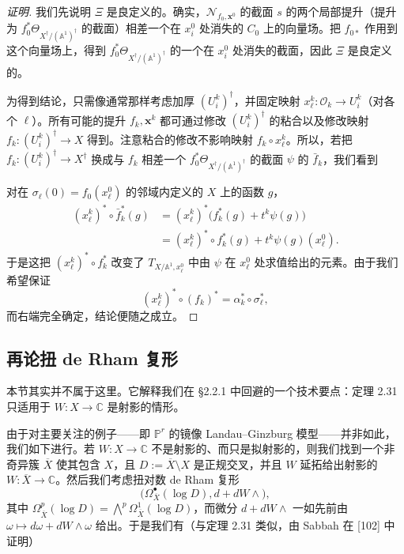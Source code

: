 \begin{proof}[证明]
我们先说明 $\Xi$ 是良定义的。确实，$\mathcal{N}_{f_0,\mathbf{x}^0}$ 的截面 $s$ 的两个局部提升（提升为 $f_0^{*}\Theta_{X^{\dagger}/(\mathbb{A}^1)^{\dagger}}$ 的截面）相差一个在 $x_i^0$ 处消失的 $C_0$ 上的向量场。把 $f_{0*}$ 作用到这个向量场上，得到 $f_0^{*}\Theta_{X^{\dagger}/(\mathbb{A}^1)^{\dagger}}$ 的一个在 $x_i^0$ 处消失的截面，因此 $\Xi$ 是良定义的。

为得到结论，只需像通常那样考虑加厚 $(U_i^{k})^{\dagger}$，并固定映射 $x_\ell^{k}:\mathcal{O}_k\to U_i^{k}$（对各个 $\ell$）。所有可能的提升 $f_k,\mathbf{x}^k$ 都可通过修改 $(U_i^{k})^{\dagger}$ 的粘合以及修改映射 $f_k:(U_i^{k})^{\dagger}\to X$ 得到。注意粘合的修改不影响映射 $f_k\circ x_\ell^{k}$。所以，若把 $f_k:(U_i^{k})^{\dagger}\to X^{\dagger}$ 换成与 $f_k$ 相差一个 $f_0^{*}\Theta_{X^{\dagger}/(\mathbb{A}^1)^{\dagger}}$ 的截面 $\psi$ 的 $\bar f_k$，我们看到

对在 $\sigma_\ell(0)=f_0(x_\ell^0)$ 的邻域内定义的 $X$ 上的函数 $g$，
\begin{align*}
  (x_\ell^{k})^{*}\circ\bar f_k^{*}(g)
  &=(x_\ell^{k})^{*}\bigl(f_k^{*}(g)+t^k\psi(g)\bigr)\\
  &=(x_\ell^{k})^{*}\circ f_k^{*}(g)+t^k\psi(g)(x_\ell^0).
\end{align*}
于是这把 $(x_\ell^{k})^{*}\circ f_k^{*}$ 改变了 $T_{X/\mathbb{A}^1,x_\ell^0}$ 中由 $\psi$ 在 $x_\ell^0$ 处求值给出的元素。由于我们希望保证
\[
  (x_\ell^{k})^{*}\circ(f_k)^{*}=\alpha_k^{*}\circ\sigma_\ell^{*},
\]
而右端完全确定，结论便随之成立。
\end{proof}

\subsection{再论扭 de Rham 复形}

本节其实并不属于这里。它解释我们在 §2.2.1 中回避的一个技术要点：定理 2.31 只适用于 $W:X\to\mathbb{C}$ 是射影的情形。

由于对主要关注的例子——即 $\mathbb{P}^r$ 的镜像 Landau–Ginzburg 模型——并非如此，我们如下进行。若 $W:X\to\mathbb{C}$ 不是射影的、而只是拟射影的，则我们找到一个非奇异簇 $\overline{X}$ 使其包含 $X$，且 $D:=\overline{X}\setminus X$ 是正规交叉，并且 $W$ 延拓给出射影的 $W:\overline{X}\to\mathbb{C}$。然后我们考虑扭对数 de Rham 复形
\[
  \bigl(\Omega^{\bullet}_{\overline{X}}(\log D),d+dW\wedge\bigr),
\]
其中 $\Omega^p_{\overline{X}}(\log D)=\bigwedge^p\Omega^1_{\overline{X}}(\log D)$，而微分 $d+dW\wedge$ 一如先前由 $\omega\mapsto d\omega+dW\wedge\omega$ 给出。于是我们有（与定理 2.31 类似，由 Sabbah 在 [102] 中证明）

